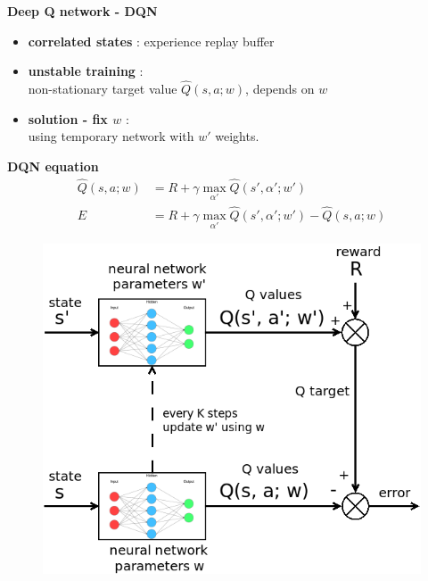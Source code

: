 \documentclass[xcolor=dvipsnames]{beamer}
\begin{document}
\begin{frame}{\bf Deep Q network - DQN}

\begin{itemize}
\item {\bf \color{red} correlated states} : experience replay buffer\\
\item {\bf \color{red} unstable training} : \\
non-stationary target value $\hat{Q}(s, a; w)$, depends on $w$
\item {\bf \color{red} solution - fix $w$} : \\
using temporary network with $w'$ weights.
\end{itemize}
{\bf DQN equation}
\begin{align*}
  \hat{Q}(s, a; w) &= R + \gamma \max \limits_{\alpha'} \hat{Q}(s', \alpha'; w') \\
  E &= R + \gamma \max \limits_{\alpha'} \hat{Q}(s', \alpha'; w') - \hat{Q}(s, a; w)
  \label{eq:dqn}
\end{align*}

\begin{figure}[!htb]
  \centering
  \includegraphics[scale=0.16]{../../diagrams/dqn.png}
  \label{img:dqn}
\end{figure}



\end{frame}
\end{document}
